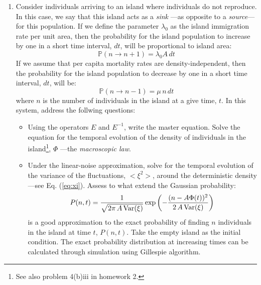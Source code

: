 \documentclass{article}
\newcommand{\Pb}{{\mathbb P}}
\begin{document}
\begin{enumerate}
\item Consider individuals arriving to an island where individuals do not reproduce. In this case, we say that this island acts as a {\em sink} ---as opposite to a {\em source}--- for this population. If we define the parameter $\lambda_0$ as the island immigration rate per unit area, then the probability for the island population to increase by one in a short time interval, $dt$, will be proportional to island area:
\begin{equation}
  \Pb(n \rightarrow n + 1) = \lambda_0 A\, dt 
\end{equation} 
If we assume that per capita mortality rates are density-independent, then the probability for the island population to decrease by one in a short time interval, $dt$, will be:  
\begin{equation}
  \Pb(n \rightarrow n - 1) = \mu \,n\, dt 
\end{equation}  
where $n$ is the number of individuals in the island at a give time, $t$. In this system, address the follwing questions: 
\begin{itemize} 
\item Using the operators $E$ and $E^{-1}$, write the master equation. Solve the equation for the temporal evolution of the density of individuals in the island\footnote{See also problem 4(b)iii in homework 2.}, $\Phi$ ---the {\em macroscopic law}. 
\item Under the linear-noise approximation, solve for the temporal evolution of the variance of the fluctuations,  $<\xi^2>$, around the deterministic density ---see Eq. (\ref{eq:xi}). Assess to what extend the Gaussian probability:
\begin{equation}
  P(n,t) = \frac{1}{\sqrt{2\pi\,A\,\textup{Var}(\xi)}}\exp\left(-\frac{(n-A\Phi(t))^2}{2\,A\,\textup{Var}(\xi)}\right)
\end{equation} 
is a good approximation to the exact probability of finding $n$ individuals in the island at time $t$, $P(n,t)$. Take the empty island as the initial condition. The exact probability distribution at increasing times can be calculated through simulation using Gillespie algorithm. 
\end{itemize}


\end{enumerate}
\end{document}
